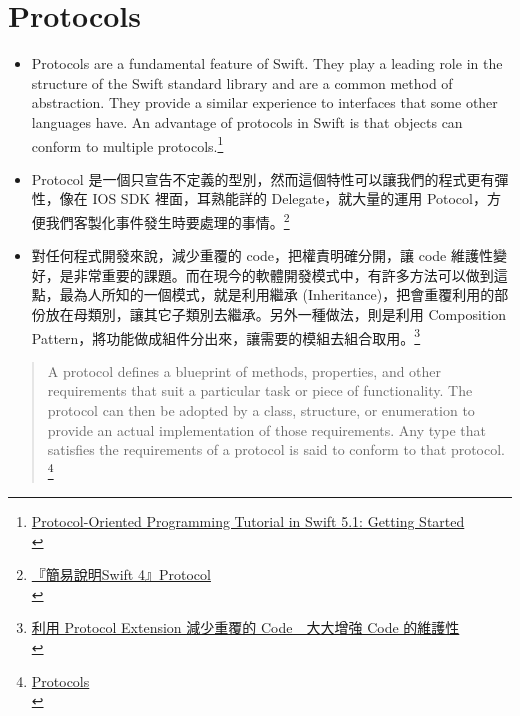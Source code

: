 \documentclass[a4paper,12pt]{article}
\begin{document}
\section{Protocols}
\label{SW-Protocols}
\begin{itemize}
\item Protocols are a fundamental feature of Swift. They play a leading role in the structure of the Swift standard library and are a common method of abstraction. They provide a similar experience to interfaces that some other languages have. An advantage of protocols in Swift is that objects can conform to multiple protocols.\footnote{\href{https://www.raywenderlich.com/6742901-protocol-oriented-programming-tutorial-in-swift-5-1-getting-started}{Protocol-Oriented Programming Tutorial in Swift 5.1: Getting Started}\\}\\
\item Protocol 是一個只宣告不定義的型別，然而這個特性可以讓我們的程式更有彈性，像在 IOS SDK 裡面，耳熟能詳的 Delegate，就大量的運用 Potocol，方便我們客製化事件發生時要處理的事情。\footnote{\href{https://medium.com/\%E5\%BD\%BC\%E5\%BE\%97\%E6\%BD\%98\%E7\%9A\%84-swift-ios-app-\%E9\%96\%8B\%E7\%99\%BC\%E6\%95\%99\%E5\%AE\%A4/\%E7\%B0\%A1\%E6\%98\%93\%E8\%AA\%AA\%E6\%98\%8Eswift-4-protocol-919b7f9cbaee}{『簡易說明Swift 4』Protocol}\\}\\

\item 對任何程式開發來說，減少重覆的 code，把權責明確分開，讓 code 維護性變好，是非常重要的課題。而在現今的軟體開發模式中，有許多方法可以做到這點，最為人所知的一個模式，就是利用繼承 (Inheritance)，把會重覆利用的部份放在母類別，讓其它子類別去繼承。另外一種做法，則是利用 Composition Pattern，將功能做成組件分出來，讓需要的模組去組合取用。\footnote{\href{https://www.appcoda.com.tw/protocol-extension/}{利用 Protocol Extension 減少重覆的 Code　大大增強 Code 的維護性}\\}\\
\end{itemize}
\begin{verse}
A protocol defines a blueprint of methods, properties, and other requirements that suit a particular task or piece of functionality. The protocol can then be adopted by a class, structure, or enumeration to provide an actual implementation of those requirements. Any type that satisfies the requirements of a protocol is said to conform to that protocol. \footnote{\href{https://docs.swift.org/swift-book/LanguageGuide/Protocols.html}{Protocols}\\}\\
\end{verse}
\end{document}
